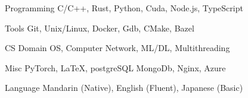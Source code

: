 

\begin{cvskills}

  \cvskill
    {Programming} %
    {C/C++, Rust, Python, Cuda, Node.js, TypeScript} %

  \cvskill
    {Tools} %
    {Git, Unix/Linux, Docker, Gdb, CMake, Bazel} %

  \cvskill
    {CS Domain} %
    {OS, Computer Network, ML/DL, Multithreading} %

  \cvskill
    {Misc} %
    {PyTorch, LaTeX, postgreSQL MongoDb, Nginx, Azure} %

  \cvskill
    {Language} %
    {Mandarin (Native), English (Fluent), Japanese (Basic)} %
\end{cvskills}
